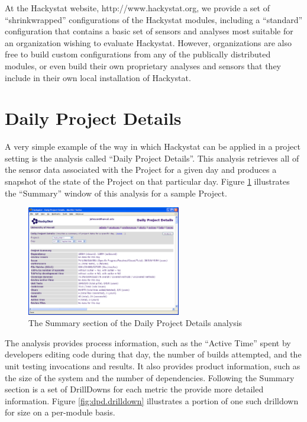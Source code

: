 \documentclass[12pt]{article}
\begin{document}
At the Hackystat website, http://www.hackystat.org, we provide a set of
``shrinkwrapped'' configurations of the Hackystat modules, including a
``standard'' configuration that contains a basic set of sensors and
analyses most suitable for an organization wishing to evaluate Hackystat.
However, organizations are also free to build custom configurations from
any of the publically distributed modules, or even build their own
proprietary analyses and sensors that they include in their own local
installation of Hackystat.

\section{Daily Project Details}

A very simple example of the way in which Hackystat can be applied in a
project setting is the analysis called ``Daily Project Details''. This
analysis retrieves all of the sensor data associated with the Project 
for a given day and produces a snapshot of the state of the Project 
on that particular day.  Figure \ref{fig:dpd} illustrates the 
``Summary'' window of this analysis for a sample Project.  

\begin{figure}[t]
  \centering
  \includegraphics[width=0.60\textwidth]{dpd.eps}
  \caption{The Summary section of the Daily Project Details analysis}
  \label{fig:dpd}
\end{figure}

The analysis provides process information, such as the ``Active Time''
spent by developers editing code during that day, the number of builds
attempted, and the unit testing invocations and results.  It also provides
product information, such as the size of the system and the number of
dependencies.  Following the Summary section is a set of DrillDowns for
each metric the provide more detailed information.  Figure
\ref{fig:dpd.drilldown} illustrates a portion of one such drilldown for
size on a per-module basis.
\end{document}
